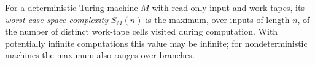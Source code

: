 
For a deterministic Turing machine $M$ with read-only input and work tapes, its \emph{worst-case space complexity} $S_M(n)$ is the maximum, over inputs of length $n$, of the number of distinct work-tape cells visited during computation. With potentially infinite computations this value may be infinite; for nondeterministic machines the maximum also ranges over branches.
